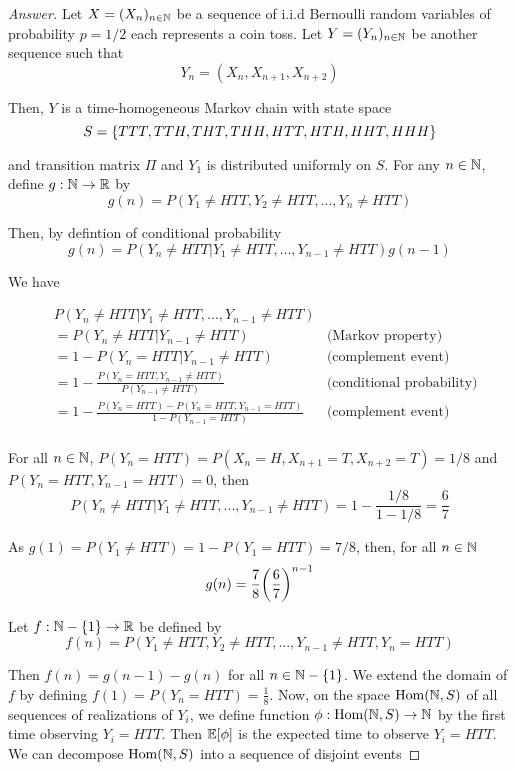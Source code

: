 \documentclass{article}
\begin{document}
\begin{proof}[Answer]

Let $X = (X_n)_{n \in \mathbb{N}}$ be a sequence of i.i.d Bernoulli random variables of probability $p=1/2$ each represents a coin toss. Let $Y = (Y_n)_{n \in \mathbb{N}}$ be another sequence such that
$$
    Y_n = (X_n, X_{n+1}, X_{n+2})
$$

Then, $Y$ is a time-homogeneous Markov chain with state space
$$
    S = \{TTT, TTH, THT, THH, HTT, HTH, HHT, HHH\}
$$

and transition matrix $\Pi$ and $Y_1$ is distributed uniformly on $S$. For any $n \in \mathbb{N}$, define $g: \mathbb{N} \to \mathbb{R}$ by
$$
    g(n) = P(Y_1 \neq HTT, Y_2 \neq HTT, ..., Y_n \neq HTT)
$$

Then, by defintion of conditional probability
$$
    g(n) = P(Y_n \neq HTT | Y_1 \neq HTT, ..., Y_{n-1} \neq HTT) g(n-1)
$$

We have

\begin{align*}
    & P(Y_n \neq HTT | Y_1 \neq HTT, ..., Y_{n-1} \neq HTT) \\
    &= P(Y_n \neq HTT | Y_{n-1} \neq HTT) &\text{(Markov property)}\\
    &= 1 - P(Y_n = HTT | Y_{n-1} \neq HTT) &\text{(complement event)}\\
    &= 1 - \frac{P(Y_n = HTT, Y_{n-1} \neq HTT)}{P(Y_{n-1} \neq HTT)} &\text{(conditional probability)}\\
    &= 1 - \frac{P(Y_n = HTT) - P(Y_n = HTT, Y_{n-1} = HTT)}{1 - P(Y_{n-1} = HTT)} &\text{(complement event)}\\
\end{align*}

For all $n \in \mathbb{N}$, $P(Y_n = HTT) = P(X_n=H, X_{n+1}=T, X_{n+2}=T) = 1/8$ and $P(Y_n = HTT, Y_{n-1} = HTT) = 0$, then
$$
    P(Y_n \neq HTT | Y_1 \neq HTT, ..., Y_{n-1} \neq HTT) = 1 - \frac{1/8}{1 - 1/8} = \frac{6}{7}
$$

As $g(1) = P(Y_1 \neq HTT) = 1 - P(Y_1 = HTT) = 7/8$, then, for all $n \in \mathbb{N}$
$$
    g(n) = \frac{7}{8} \tuple*{\frac{6}{7}}^{n-1}
$$

Let $f: \mathbb{N} - \{1\} \to \mathbb{R}$ be defined by
$$
    f(n) = P(Y_1 \neq HTT, Y_2 \neq HTT, ..., Y_{n-1} \neq HTT, Y_n = HTT)
$$

Then $f(n) = g(n-1) - g(n)$ for all $n \in \mathbb{N} - \{1\}$. We extend the domain of $f$ by defining $f(1) = P(Y_n = HTT) = \frac{1}{8}$. Now, on the space $\operatorname{Hom}(\mathbb{N}, S)$ of all sequences of realizations of $Y_i$, we define function $\phi: \operatorname{Hom}(\mathbb{N}, S) \to \mathbb{N}$ by the first time observing $Y_i = HTT$. Then $\mathbb{E}[\phi]$ is the expected time to observe $Y_i = HTT$. We can decompose $\operatorname{Hom}(\mathbb{N}, S)$ into a sequence of disjoint events


\end{proof}
\end{document}
